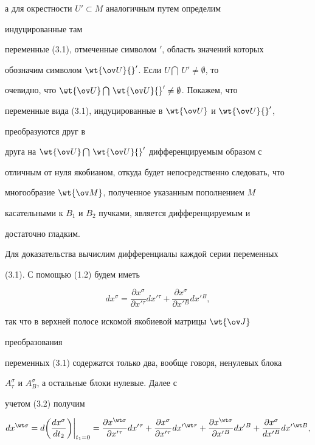 а для окрестности $U'\subset M$ аналогичным путем определим


индуцированные там


переменные (3.1), отмеченные символом ${}'$, область значений которых


обозначим символом $\wt{\ov U}{}'$. Если $U\bigcap\, U'\ne\emptyset$, то


очевидно, что $\wt{\ov U}\bigcap\,\wt{\ov U}{}'\ne\emptyset$. Покажем, что


переменные вида (3.1), индуцированные в $\wt{\ov U}$ и $\wt{\ov U}{}'$,


преобразуются друг в


друга на $\wt{\ov U}\bigcap\,\wt{\ov U}{}'$ дифференцируемым образом с


отличным от нуля якобианом, откуда будет непосредственно следовать, что


многообразие $\wt{\ov M}$, полученное указанным пополнением $M$


касательными к $B_1$ и $B_2$ пучками, является дифференцируемым и


достаточно гладким.





Для доказательства вычислим дифференциалы каждой серии переменных


(3.1). С помощью (1.2) будем иметь


\begin{equation}


dx^\sigma=\frac{\partial x^\sigma}{\partial x'{}^\tau}


dx'{}^\tau+\frac{\partial x^\sigma}{\partial x'{}^B}


dx'{}^B,


\end{equation}


так что в верхней полосе искомой якобиевой матрицы $\wt{\ov J}$


преобразования


переменных (3.1) содержатся только два, вообще говоря, ненулевых блока


$A^\sigma_\tau$ и $A^\sigma_B$, а остальные блоки нулевые. Далее с


учетом (3.2) получим


\begin{equation}


dx^{\wt\sigma}=d\biggl(\frac{dx^\sigma}{dt_2}\biggr)


\biggl.\biggr|_{t_1=0}=


\frac{\partial x^{\wt\sigma}}{\partial x'{}^\tau}


dx'{}^\tau+\frac{\partial x^\sigma}{\partial x'{}^\tau}


dx'{}^{\wt\tau}+


\frac{\partial x^{\wt\sigma}}{\partial x'{}^B}dx'{}^B+


\frac{\partial x^\sigma}{dx'{}^B}dx'{}^{\wt B},


\end{equation}


